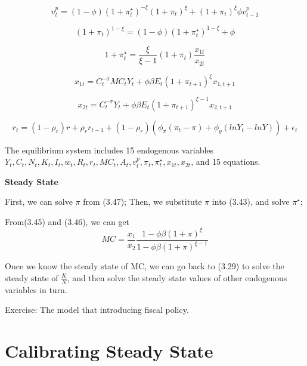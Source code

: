 \documentclass[10pt,math=newtx,citestyle=gb7714-2015,bibstyle=gb7714-2015]{elegantbook}
\begin{document}
	\begin{equation}\label{label}
		v_t^p=(1-\phi)(1+\pi_t^{\star})^{-\xi}(1+\pi_t)^{\xi}+(1+\pi_t)^{\xi}\phi v_{t-1}^p
	\end{equation}
	
	\begin{equation}\label{label}
		(1+\pi_t)^{1-\xi}=(1-\phi)(1+\pi_t^{\star})^{1-\xi}+\phi
	\end{equation}
	
	\begin{equation}\label{label}
		1+\pi_t^{\star}=\frac{\xi}{\xi-1}(1+\pi_t)\frac{x_{1t}}{x_{2t}}
	\end{equation}
	
	\begin{equation}\label{label}
		x_{1t}=C_t^{-\sigma}MC_tY_t+\phi \beta E_t(1+\pi_{t+1})^{\xi}x_{1,t+1}
	\end{equation}
	
	\begin{equation}\label{label}
		x_{2t}=C_t^{-\sigma}Y_t+\phi \beta E_t(1+\pi_{t+1})^{\xi-1}x_{2,t+1}
	\end{equation}
	
	\begin{equation}\label{label}
		r_t=(1-\rho_r)r+\rho_rr_{t-1}+(1-\rho_r)(\phi_{\pi}(\pi_t-\pi)+\phi_y(lnY_t-lnY))+\epsilon_t
	\end{equation}
	
	The equilibrium system includes 15 endogenous variables $Y_t,C_t,N_t,K_t,I_t,w_t,R_t,r_t,MC_t,A_t,v_t^p,\pi_t,\pi_t^{\star},x_{1t},x_{2t}$, and 15 equations.

	
	\textbf{Steady State}
	
	First, we can solve $\pi$ from (3.47);
	Then, we substitute $\pi$ into (3.43), and solve $\pi^{\star}$;
	
	From(3.45) and (3.46), we can get
	$$MC=\frac{x_{1}}{x_{2}}\frac{1-\phi \beta(1+\pi)^{\xi}}{1-\phi \beta(1+\pi)^{\xi-1}}$$
	
	Once we know the steady state of MC, we can go back to (3.29) to solve the steady state of $\frac{K}{N}$, and then solve the steady state values of other endogenous variables in turn.
	
	Exercise: The model that introducing fiscal policy.
	
	
	\section{Calibrating Steady State}
	
\end{document}
